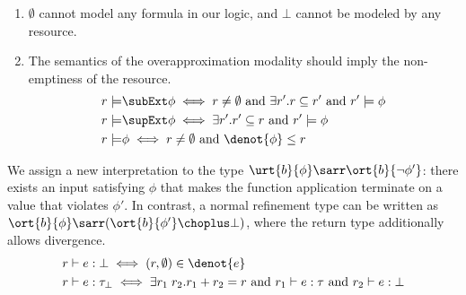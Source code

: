 \begin{enumerate}
  \item $\emptyset$ cannot model any formula in our logic, and $\bot$ cannot be modeled by any resource.
  \item The semantics of the overapproximation modality should imply the non-emptiness of the resource.
  \begin{align*}
    r \models &\subExt \phi \iff r \neq \emptyset \text{ and } \exists r'. r \subseteq r' \text{ and } r' \models \phi
    \\r \models &\supExt \phi \iff \exists r'. r' \subseteq r \text{ and } r' \models \phi
    \\r \models &\phi \iff r \neq \emptyset \text{ and } \denot{\phi} \leq r
  \end{align*}\noindent
\end{enumerate}
We assign a new interpretation to the type $\urt{b}{\phi} \sarr \ort{b}{\neg \phi'}$: there exists an input satisfying $\phi$ that makes the function application terminate on a value that violates $\phi'$. In contrast, a normal refinement type can be written as $\ort{b}{\phi} \sarr (\ort{b}{\phi'} \choplus \bot)$, where the return type additionally allows divergence.
\begin{align*}
 &r \vdash e : \bot \iff (r, \emptyset) \in \denot{e}
 \\&r \vdash e : \tau_\bot \iff \exists r_1\;r_2. r_1 + r_2 = r \text{ and } r_1 \vdash e : \tau \text{ and } r_2 \vdash e : \bot
\end{align*}\noindent

